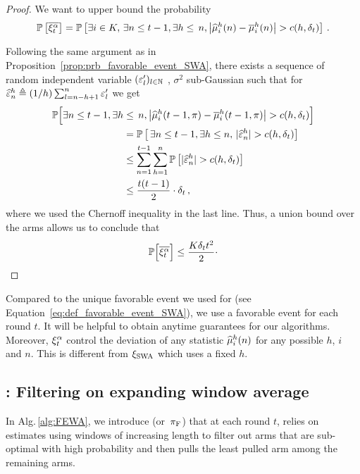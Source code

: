 \begin{proof}
We want to upper bound the probability
\[
\PP{\bar{\HPevent}} = \PP{\exists i \in K,\,\exists n \leq t-1, \exists h \leq\, n, \big|\hmu^h_i(n)-\bmu^h_i(n)\big|>c(h,\delta_t) }\,.
\]

Following the same argument as in Proposition~\ref{prop:prb_favorable_event_SWA}, there exists a sequence of random independent variable $(\varepsilon'_l)_{l\in{\mathbb N}}$ , $\sigma^2$ sub-Gaussian such that for $\widehat{\varepsilon}^h_n \triangleq (1/h) \sum_{l=n-h+1}^n \varepsilon'_l$ we get 
\begin{align*}
    \PPv\Big[\exists n \leq t-1, \exists h &\leq\, n, \big|\hmu^h_i(t-1,\pi)-\bmu^h_i(t-1,\pi)\big|>c(h,\delta_t) \Big]\\
    &= \PP{\,\exists n \leq t-1, \exists h \leq n,\, |\hepsilon^h_n|>c(h,\delta_t) }\\
    &\leq \sum_{n=1}^{t-1}\sum_{h=1}^n \PP{|\hepsilon^h_n|>c(h,\delta_t)} \\
    &\leq  \frac{t(t-1)}{2}\cdot \delta_t \,,
\end{align*}
where we used the Chernoff inequality in the last line. Thus, a union bound  over the arms allows us to conclude that
\[
\mathbb{P} \Big[\overline{\xi^\alpha_t}\Big]\leq \frac{K \delta_t t^2}{2}\cdot
\]
\end{proof}
\begin{remark}
Compared to the unique favorable event we used for \SWA (see Equation~\ref{eq:def_favorable_event_SWA}), we use a favorable event for each round $t$. It will be helpful to obtain anytime guarantees for our algorithms. Moreover, $\xi^\alpha_t$ control the deviation of any statistic $\widehat{\mu}_i^h(n)$ for any possible $h$, $i$ and $n$. This is different from $\xi_{\rm SWA}$ which uses a fixed $h$. 
\end{remark}

\subsection{{\FEWA}: Filtering on expanding window average}

In Alg.\,\ref{alg:FEWA}, we introduce \FEWA (or~$\pi_{\rm F}$) that at each round $t$, relies on estimates using windows of increasing length to filter out arms that are sub-optimal with high probability and then pulls the least pulled arm among the remaining arms. 
 
